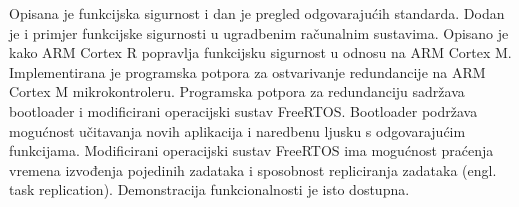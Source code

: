 \documentclass[utf8, diplomski, english, numeric]{fer}
\begin{document}
\begin{sazetak}

Opisana je funkcijska sigurnost i dan je pregled odgovarajućih standarda. Dodan je i primjer funkcijske sigurnosti u ugradbenim računalnim sustavima. Opisano je kako ARM Cortex R popravlja funkcijsku sigurnost u odnosu na ARM Cortex M.
Implementirana je programska potpora za ostvarivanje redundancije na ARM Cortex M mikrokontroleru. Programska potpora za redundanciju sadržava bootloader i modificirani operacijski sustav FreeRTOS. Bootloader podržava mogućnost učitavanja novih aplikacija i naredbenu ljusku s odgovarajućim funkcijama. Modificirani operacijski sustav FreeRTOS ima mogućnost praćenja vremena izvođenja pojedinih zadataka i sposobnost repliciranja zadataka (engl. task replication). Demonstracija funkcionalnosti je isto dostupna.

\end{sazetak}

\begin{appendices}


\end{appendices}
\end{document}
